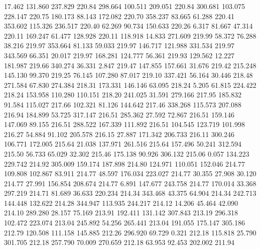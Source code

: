   17.462  131.860  237.829       220.84
 298.664  100.511  209.051       220.84
 300.681  103.075  228.147       220.75
 180.173   88.143  172.082       220.70
 358.237   83.665   61.288       220.41
 353.602  115.326  236.517       220.40
  62.269   90.734  150.633       220.26
   6.317   81.667   47.314       220.11
 169.247   61.477  128.928       220.11
 118.918   14.833  271.609       219.99
  58.372   76.288   38.216       219.97
 353.664   81.133   59.033       219.97
 146.717  121.988  331.534       219.97
 343.569   66.351   20.017       219.97
 168.281  124.777   56.361       219.93
 129.562   12.227  181.987       219.66
 340.274   36.331    2.847       219.47
 147.855  157.661   31.676       219.42
 215.248  145.130   99.370       219.25
  76.145  107.280   87.017       219.10
 337.421   56.164   30.446       218.48
 271.584   67.830  274.384       218.31
 173.331  146.146   63.095       218.24
   5.205   61.815  224.422       218.24
 153.958  110.280  110.151       218.20
 241.025   31.591  279.166       217.95
 185.832   91.584  115.027       217.66
 102.321   81.126  144.642       217.46
 338.268  115.573  207.088       216.94
 184.899   53.725  317.147       216.51
 285.362   27.592   72.867       216.51
 159.146  147.069   89.155       216.51
 288.522  167.339  111.892       216.51
 104.545  123.719  101.998       216.27
  54.884   91.102  205.578       216.15
  27.887  171.342  206.733       216.11
 300.246  106.771  172.005       215.64
  21.038  137.971  261.516       215.64
 157.496   50.241  312.594       215.50
  56.733   65.029   32.302       215.46
 175.138   90.926  306.132       215.06
   0.057  134.223  229.742       214.92
 305.009  159.174  187.898       214.80
 124.971  110.051  152.046       214.77
 109.808  102.867   83.911       214.77
  48.597  176.034  223.027       214.77
  30.355   27.908   30.120       214.77
  27.991  156.854  208.674       214.77
   6.891  147.677  243.758       214.77
 170.014   33.368  297.219       214.71
  81.689   36.633  220.234       214.34
 343.468   43.375   64.904       214.34
 242.713  144.448  132.622       214.28
 344.947  113.935  244.217       214.12
  14.206   45.464   42.090       214.10
 289.280   28.157   75.169       213.91
 192.411  131.142  307.843       213.19
 296.318  102.472  223.074       213.04
 245.892   54.256  265.441       213.04
 191.055  175.147  305.186       212.79
 120.508  111.158  145.885       212.26
 296.920   69.729    0.321       212.18
 115.818   25.790  301.705       212.18
 257.790   70.009  270.659       212.18
  63.953   92.453  202.002       211.94
